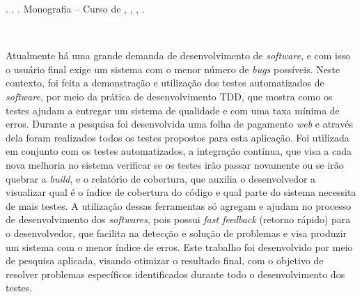 







\begin{OnehalfSpacing} 

\noindent \imprimirAutorCitacaoMaiuscula. {\bfseries\imprimirtitulo}. {\imprimirdata}.  Monografia -- Curso de {\MakeUppercase\imprimircurso}, {\imprimirinstituicao}, {\imprimirlocal}, {\imprimirdata}.

\vspace{\onelineskip}
\vspace{\onelineskip}
\vspace{\onelineskip}
\vspace{\onelineskip}

\begin{resumo}
~\\
\begin{comment}


\noindent Este trabalho apresenta \ldots
 \end{comment}
 
 
 \par Atualmente há uma grande demanda de desenvolvimento de \textit{software}, e com isso o usuário final exige um sistema com o menor número de \textit{bugs} possíveis. Neste contexto, foi feita a demonstração e utilização dos testes automatizados de \textit{software}, por meio da prática de desenvolvimento TDD, que mostra como os testes ajudam a entregar um sistema de qualidade e com uma taxa mínima de erros. Durante a pesquisa foi desenvolvida uma folha de pagamento \textit{web} e através dela foram realizados todos os testes propostos para esta aplicação. Foi utilizada em conjunto com os testes automatizados, a integração contínua, que visa a cada nova melhoria no sistema verificar se os testes irão passar novamente ou se irão quebrar a \textit{build}, e o relatório de cobertura, que auxilia o desenvolvedor a visualizar qual é o índice de cobertura do código e qual parte do sistema necessita de mais testes. A utilização dessas ferramentas só agregam e ajudam no processo de desenvolvimento dos \textit{softwares}, pois possui \textit{fast feedback} (retorno rápido) para o desenvolvedor, que facilita na detecção e solução de problemas e visa produzir um sistema com o menor índice de erros. Este trabalho foi desenvolvido por meio de pesquisa aplicada, visando otimizar o resultado final, com o objetivo de resolver problemas específicos identificados durante todo o desenvolvimento dos testes.
 

\end{resumo}
\end{OnehalfSpacing}
